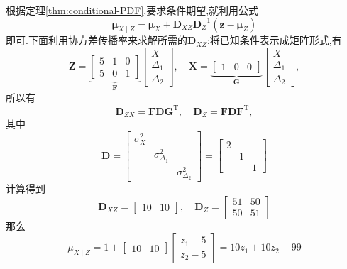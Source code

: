\documentclass[cn,10pt,citestyle=gb7714-2015,bibstyle=gb7714-2015]{elegantbook}
\newcommand{\mT}{\mathrm{T}}
\begin{document}
\begin{solution}
  根据定理\ref{thm:conditional-PDF},要求条件期望,就利用公式
  \[
      \bm{\mu}_{X\mid Z}=\bm{\mu}_X+\bm{D}_{XZ}\bm{D}_Z^{-1}(\bm{z}-\bm{\mu}_Z)
  \]
  即可.下面利用协方差传播率来求解所需的$\bm{D}_{XZ}$:将已知条件表示成矩阵形式,有
  \[
      \bm{Z}=\underbrace{\begin{bmatrix}
        5&1&0\\
        5&0&1
      \end{bmatrix}}_{\bm{F}}\begin{bmatrix}
        X\\
        \varDelta_1\\
        \varDelta_2
      \end{bmatrix},\quad
      \bm{X}=\underbrace{\begin{bmatrix}
        1&0&0
      \end{bmatrix}}_{\bm{G}}\begin{bmatrix}
        X\\
        \varDelta_1\\
        \varDelta_2
      \end{bmatrix},
  \]
  所以有
  \[
      \bm{D}_{ZX}=\bm{F}\bm{D}\bm{G}^\mT,\quad\bm{D}_Z=\bm{F}\bm{D}\bm{F}^\mT,
  \]
  其中
  \[
      \bm{D}=\begin{bmatrix}
        \sigma_X^2& & \\
         &\sigma_{\varDelta_1}^2& \\
         & &\sigma_{\varDelta_2}^2
      \end{bmatrix}=\begin{bmatrix}
        2& & \\
         &1& \\
         & &1
      \end{bmatrix}
  \]
  计算得到
  \[
      \bm{D}_{XZ}=\begin{bmatrix}
        10&10
      \end{bmatrix},\quad\bm{D}_Z=\begin{bmatrix}
        51&50\\
        50&51
      \end{bmatrix}
  \]
  那么
  \[
      \mu_{X\mid Z}=1+\begin{bmatrix}
        10&10
      \end{bmatrix}\begin{bmatrix}
        z_1-5\\
        z_2-5
      \end{bmatrix}=10z_1+10z_2-99
  \]
\end{solution}
\end{document}
